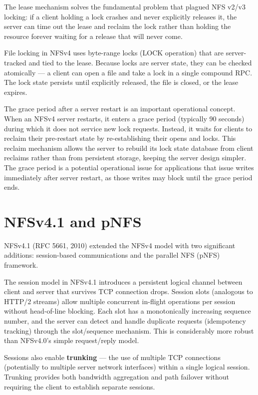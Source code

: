 The lease mechanism solves the fundamental problem that plagued NFS v2/v3 locking: if a client holding a lock crashes and never explicitly releases it, the server can time out the lease and reclaim the lock rather than holding the resource forever waiting for a release that will never come.

File locking in NFSv4 uses byte-range locks (LOCK operation) that are server-tracked and tied to the lease. Because locks are server state, they can be checked atomically --- a client can open a file and take a lock in a single compound RPC. The lock state persists until explicitly released, the file is closed, or the lease expires.

The grace period after a server restart is an important operational concept. When an NFSv4 server restarts, it enters a grace period (typically 90 seconds) during which it does not service new lock requests. Instead, it waits for clients to reclaim their pre-restart state by re-establishing their opens and locks. This reclaim mechanism allows the server to rebuild its lock state database from client reclaims rather than from persistent storage, keeping the server design simpler. The grace period is a potential operational issue for applications that issue writes immediately after server restart, as those writes may block until the grace period ends.

\section{NFSv4.1 and pNFS}
NFSv4.1 (RFC 5661, 2010) extended the NFSv4 model with two significant additions: session-based communications and the parallel NFS (pNFS) framework.

The session model in NFSv4.1 introduces a persistent logical channel between client and server that survives TCP connection drops. Session slots (analogous to HTTP/2 streams) allow multiple concurrent in-flight operations per session without head-of-line blocking. Each slot has a monotonically increasing sequence number, and the server can detect and handle duplicate requests (idempotency tracking) through the slot/sequence mechanism. This is considerably more robust than NFSv4.0's simple request/reply model.

Sessions also enable \textbf{trunking} --- the use of multiple TCP connections (potentially to multiple server network interfaces) within a single logical session. Trunking provides both bandwidth aggregation and path failover without requiring the client to establish separate sessions.

